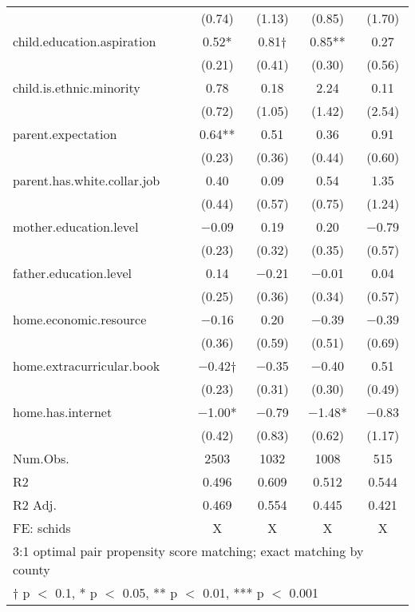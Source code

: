\documentclass[
  man,floatsintext]{apa7}
\begin{document}
\begin{table}
\begin{tabular}[t]{lcccc}
 & (\num{0.74}) & (\num{1.13}) & (\num{0.85}) & (\num{1.70})\\
child.education.aspiration & \num{0.52}* & \num{0.81}† & \num{0.85}** & \num{0.27}\\
 & (\num{0.21}) & (\num{0.41}) & (\num{0.30}) & (\num{0.56})\\
child.is.ethnic.minority & \num{0.78} & \num{0.18} & \num{2.24} & \num{0.11}\\
 & (\num{0.72}) & (\num{1.05}) & (\num{1.42}) & (\num{2.54})\\
parent.expectation & \num{0.64}** & \num{0.51} & \num{0.36} & \num{0.91}\\
 & (\num{0.23}) & (\num{0.36}) & (\num{0.44}) & (\num{0.60})\\
parent.has.white.collar.job & \num{0.40} & \num{0.09} & \num{0.54} & \num{1.35}\\
 & (\num{0.44}) & (\num{0.57}) & (\num{0.75}) & (\num{1.24})\\
mother.education.level & \num{-0.09} & \num{0.19} & \num{0.20} & \num{-0.79}\\
 & (\num{0.23}) & (\num{0.32}) & (\num{0.35}) & (\num{0.57})\\
father.education.level & \num{0.14} & \num{-0.21} & \num{-0.01} & \num{0.04}\\
 & (\num{0.25}) & (\num{0.36}) & (\num{0.34}) & (\num{0.57})\\
home.economic.resource & \num{-0.16} & \num{0.20} & \num{-0.39} & \num{-0.39}\\
 & (\num{0.36}) & (\num{0.59}) & (\num{0.51}) & (\num{0.69})\\
home.extracurricular.book & \num{-0.42}† & \num{-0.35} & \num{-0.40} & \num{0.51}\\
 & (\num{0.23}) & (\num{0.31}) & (\num{0.30}) & (\num{0.49})\\
home.has.internet & \num{-1.00}* & \num{-0.79} & \num{-1.48}* & \num{-0.83}\\
 & (\num{0.42}) & (\num{0.83}) & (\num{0.62}) & (\num{1.17})\\
\midrule
Num.Obs. & \num{2503} & \num{1032} & \num{1008} & \num{515}\\
R2 & \num{0.496} & \num{0.609} & \num{0.512} & \num{0.544}\\
R2 Adj. & \num{0.469} & \num{0.554} & \num{0.445} & \num{0.421}\\
FE: schids & X & X & X & X\\
\bottomrule
\multicolumn{5}{l}{\rule{0pt}{1em}3:1 optimal pair propensity score matching; exact matching by county}\\
\multicolumn{5}{l}{\rule{0pt}{1em}† p $<$ 0.1, * p $<$ 0.05, ** p $<$ 0.01, *** p $<$ 0.001}\\
\end{tabular}
\end{table}
\end{document}
